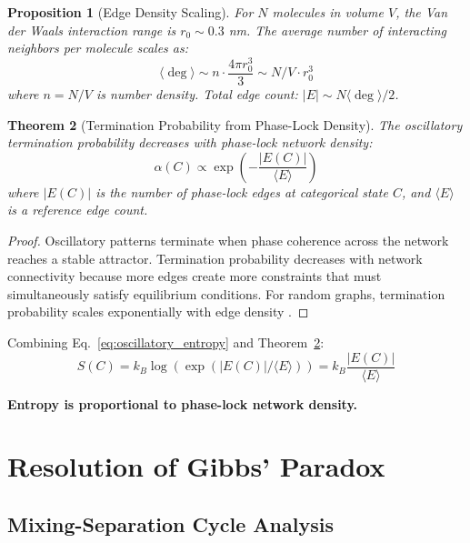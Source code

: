 \documentclass[superscriptaddress,prb,10pt]{revtex4-2}
\newtheorem{theorem}{Theorem}
\newtheorem{proposition}[theorem]{Proposition}
\theoremstyle{definition}
\theoremstyle{remark}
\begin{document}
\begin{proposition}[Edge Density Scaling]
For $N$ molecules in volume $V$, the Van der Waals interaction range is $r_0 \sim 0.3$ nm. The average number of interacting neighbors per molecule scales as:
\begin{equation}
\langle \deg \rangle \sim n \cdot \frac{4\pi r_0^3}{3} \sim N/V \cdot r_0^3
\end{equation}
where $n = N/V$ is number density. Total edge count: $|E| \sim N \langle \deg \rangle / 2$.
\end{proposition}

\begin{theorem}[Termination Probability from Phase-Lock Density]
\label{thm:alpha_topology}
The oscillatory termination probability decreases with phase-lock network density:
\begin{equation}
\alpha(C) \propto \exp\left(-\frac{|E(C)|}{\langle E \rangle}\right)
\end{equation}
where $|E(C)|$ is the number of phase-lock edges at categorical state $C$, and $\langle E \rangle$ is a reference edge count.
\end{theorem}

\begin{proof}
Oscillatory patterns terminate when phase coherence across the network reaches a stable attractor. Termination probability decreases with network connectivity because more edges create more constraints that must simultaneously satisfy equilibrium conditions. For random graphs, termination probability scales exponentially with edge density \cite{kuramoto1975,strogatz2000}.
\end{proof}

Combining Eq.~\eqref{eq:oscillatory_entropy} and Theorem~\ref{thm:alpha_topology}:
\begin{equation}
S(C) = k_B \log(\exp(|E(C)|/\langle E \rangle)) = k_B \frac{|E(C)|}{\langle E \rangle}
\label{eq:topological_entropy}
\end{equation}

\textbf{Entropy is proportional to phase-lock network density.}

\section{Resolution of Gibbs' Paradox}

\subsection{Mixing-Separation Cycle Analysis}
\end{document}
